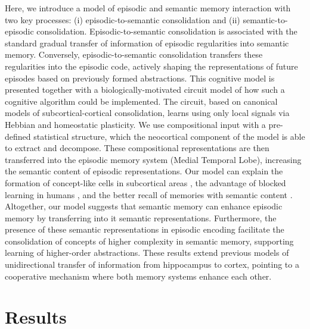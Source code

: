 \documentclass{article}
\begin{document}
Here, we introduce a model of episodic and semantic memory interaction with two key processes: (i) episodic-to-semantic consolidation and (ii) semantic-to-episodic consolidation. Episodic-to-semantic consolidation is associated with the standard gradual transfer of information of episodic regularities into semantic memory. Conversely, episodic-to-semantic consolidation transfers these regularities into the episodic code, actively shaping the representations of future episodes based on previously formed abstractions. This cognitive model is presented together with a biologically-motivated circuit model of how such a cognitive algorithm could be implemented. The circuit, based on canonical models of subcortical-cortical consolidation, learns using only local signals via Hebbian and homeostatic plasticity. We use compositional input with a pre-defined statistical structure, which the neocortical component of the model is able to extract and decompose. These compositional representations are then transferred into the episodic memory system (Medial Temporal Lobe), increasing the semantic content of episodic representations. Our model can explain the formation of concept-like cells in subcortical areas , the advantage of blocked learning in humans , and the better recall of memories with semantic content . Altogether, our model suggests that semantic memory can enhance episodic memory by transferring into it semantic representations. Furthermore, the presence of these semantic representations in episodic encoding facilitate the consolidation of concepts of higher complexity in semantic memory, supporting learning of higher-order abstractions. These results extend previous models of unidirectional transfer of information from hippocampus to cortex, pointing to a cooperative mechanism where both memory systems enhance each other.  
\newpage
\section*{Results}
\end{document}
